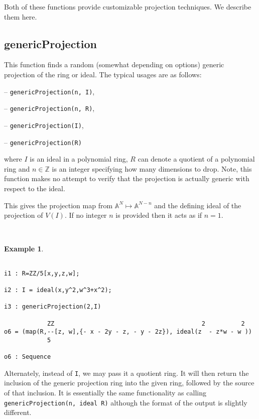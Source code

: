 \documentclass[11pt]{amsart}
\theoremstyle{definition}
\newtheorem{example}{Example}[section]
\begin{document}
Both of these functions provide customizable projection techniques. We describe them here. 


\subsection{genericProjection} 
This function finds a random (somewhat depending on options) generic projection of the ring or ideal.
The typical usages are as follows: 
\vspace{1em}

-- {\tt genericProjection(n, I)},

-- {\tt genericProjection(n, R)},


-- {\tt genericProjection(I)},  

-- {\tt genericProjection(R)} 

\vspace{1em}
\noindent where 
$I$ is an ideal 
in a polynomial ring, 
$R$ can denote a quotient of a polynomial ring and 
$n\in \mathbb{Z}$ is
an integer specifying how many dimensions to drop.  Note, this function makes no attempt to verify that the projection is actually generic with respect to the ideal.


This gives the projection map from $\mathbb{A}^N \mapsto\mathbb{A}^{N-n}$ and the defining ideal of the projection of $V(I)$. If no integer $n$ is provided then it acts as if $n = 1$. 

~~

\begin{example}	
~~

{{\small\color{blue}
	\begin{verbatim}

i1 : R=ZZ/5[x,y,z,w];

i2 : I = ideal(x,y^2,w^3+x^2);

i3 : genericProjection(2,I)

            ZZ                                         2          2
o6 = (map(R,--[z, w],{- x - 2y - z, - y - 2z}), ideal(z  - z*w - w ))                   
            5

o6 : Sequence
	\end{verbatim}
	}}
\end{example}

Alternately, instead of {\tt I}, we may pass it a quotient ring.  It will then return the inclusion of the generic projection ring into the given ring, followed by the source of that inclusion.  It is essentially the same functionality as calling {\tt genericProjection(n, ideal R)} although the format of the output is slightly different. 
\end{document}
